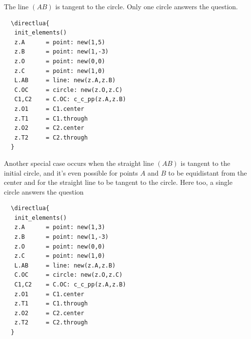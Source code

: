 The line $(AB)$ is tangent to the circle. Only one circle answers the question.

\begin{minipage}{.5\textwidth}
\begin{Verbatim}
  \directlua{
   init_elements()
   z.A      = point: new(1,5)
   z.B      = point: new(1,-3)
   z.O      = point: new(0,0)
   z.C      = point: new(1,0) 
   L.AB     = line: new(z.A,z.B)
   C.OC     = circle: new(z.O,z.C)
   C1,C2    = C.OC: c_c_pp(z.A,z.B)
   z.O1     = C1.center
   z.T1     = C1.through
   z.O2     = C2.center
   z.T2     = C2.through
  }
\end{Verbatim}
\end{minipage}
\begin{minipage}{.5\textwidth}
\end{minipage}
Another special case occurs when the straight line $(AB)$ is tangent to the initial circle, and it's even possible for points $A$ and $B$ to be equidistant from the center and for the straight line to be tangent to the circle. Here too, a single circle answers the question


\begin{minipage}{.5\textwidth}
  \begin{Verbatim}
  \directlua{
   init_elements()
   z.A      = point: new(1,3)
   z.B      = point: new(1,-3)
   z.O      = point: new(0,0)
   z.C      = point: new(1,0) 
   L.AB     = line: new(z.A,z.B)
   C.OC     = circle: new(z.O,z.C)
   C1,C2    = C.OC: c_c_pp(z.A,z.B)
   z.O1     = C1.center
   z.T1     = C1.through
   z.O2     = C2.center
   z.T2     = C2.through
  }
  \end{Verbatim}
\end{minipage}
\begin{minipage}{0.5\textwidth}
\end{minipage}

